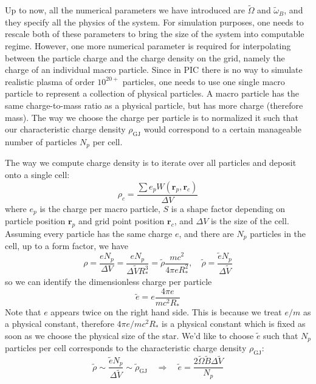 Up to now, all the numerical parameters we have introduced are $\tilde{\Omega}$
and $\tilde{\omega}_B$, and they specify all the physics of the system. For
simulation purposes, one needs to rescale both of these parameters to bring the
size of the system into computable regime. However, one more numerical parameter
is required for interpolating between the particle charge and the charge density
on the grid, namely the charge of an individual macro particle. Since in PIC
there is no way to simulate realistic plasma of order $10^{20+}$ particles, one
needs to use one single macro particle to represent a collection of physical
particles. A macro particle has the same charge-to-mass ratio as a physical
particle, but has more charge (therefore mass). The way we choose the charge per
particle is to normalized it such that our characteristic charge density
$\rho_\mathrm{GJ}$ would correspond to a certain manageable number of particles $N_p$
per cell.

The way we compute charge density is to iterate over all particles and deposit
onto a single cell:
\begin{equation}
    \rho_c = \frac{\sum e_p W(\mathbf{r}_p, \mathbf{r}_c)}{\Delta V}
\end{equation}
where $e_p$ is the charge per macro particle, $S$ is a shape factor depending on
particle position $\mathbf{r}_p$ and grid point position $\mathbf{r}_c$, and
$\Delta V$ is the size of the cell. Assuming every particle has the same charge
$e$, and there are $N_p$ particles in the cell, up to a form factor, we have
\begin{equation}
    \rho = \frac{e N_p}{\Delta V} = \frac{e N_p}{\Delta \tilde{V} R_{*}^{3}} = \tilde{\rho}\frac{mc^2}{4\pi eR_{*}^2}, \quad \tilde{\rho} = \frac{\tilde{e}N_p}{\Delta \tilde{V}}
\end{equation}
so we can identify the dimensionless charge per particle
\begin{equation}
    \tilde{e} = e \frac{4\pi e}{mc^2R_{*}}
\end{equation}
Note that $e$ appears twice on the right hand side. This is because we treat
$e/m$ as a physical constant, therefore $4\pi e / mc^2R_{*}$ is a physical
constant which is fixed as soon as we choose the physical size of the star. We'd
like to choose $\tilde{e}$ such that $N_p$ particles per cell corresponds to the
characteristic charge density $\rho_\mathrm{GJ}$:
\begin{equation}
    \tilde{\rho} \sim \frac{\tilde{e} N_p}{\Delta \tilde{V}} \sim \tilde{\rho}_\mathrm{GJ} \quad \Longrightarrow \quad \tilde{e} = \frac{2\tilde{\Omega} \tilde{B}\Delta \tilde{V}}{N_p}
\end{equation}

